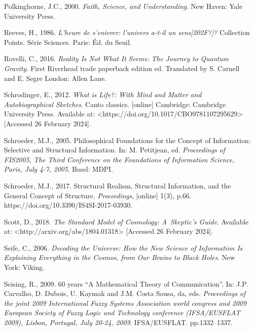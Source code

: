 Polkinghorne, J.C., 2000. \textit{Faith, Science, and Understanding}. New Haven: Yale University Press.



Reeves, H., 1986. \textit{L'heure de s'enivrer: l'univers a-t-il un sens[202F?]?} Collection Points. Série Sciences. Paris: Éd. du Seuil.



Rovelli, C., 2016. \textit{Reality Is Not What It Seems: The Journey to Quantum Gravity}. First Riverhead trade paperback edition ed. Translated by S. Carnell and E. Segre London: Allen Lane.



Schrodinger, E., 2012. \textit{What is Life?: With Mind and Matter and Autobiographical Sketches}. Canto classics. [online] Cambridge: Cambridge University Press. Available at: {\textless}https://doi.org/10.1017/CBO9781107295629{\textgreater} [Accessed 26 February 2024].



Schroeder, M.J., 2005. Philosophical Foundations for the Concept of Information: Selective and Structural Information. In: M. Petitjean, ed. \textit{Proceedings of FIS2005, The Third Conference on the Foundations of Information Science, Paris, July 4-7, 2005}. Basel: MDPI.



Schroeder, M.J., 2017. Structural Realism, Structural Information, and the General Concept of Structure. \textit{Proceedings}, [online] 1(3), p.66. https://doi.org/10.3390/IS4SI-2017-03930.



Scott, D., 2018. \textit{The Standard Model of Cosmology: A~Skeptic's Guide}. Available at: {\textless}http://arxiv.org/abs/1804.01318{\textgreater} [Accessed 26 February 2024].



Seife, C., 2006. \textit{Decoding the Universe: How the New Science of Information Is Explaining Everything in the Cosmos, from Our Brains to Black Holes}. New York: Viking.



Seising, R., 2009. 60 years ``A Mathematical Theory of Communication''. In: J.P. Carvalho, D. Dubois, U. Kaymak and J.M. Costa Sousa, da, eds. \textit{Proceedings of the joint 2009 International Fuzzy Systems Association world congress and 2009 European Society of Fuzzy Logic and Technology conference (IFSA/EUSFLAT 2009), Lisbon, Portugal, July 20-24, 2009}. IFSA/EUSFLAT. pp.1332–1337.



